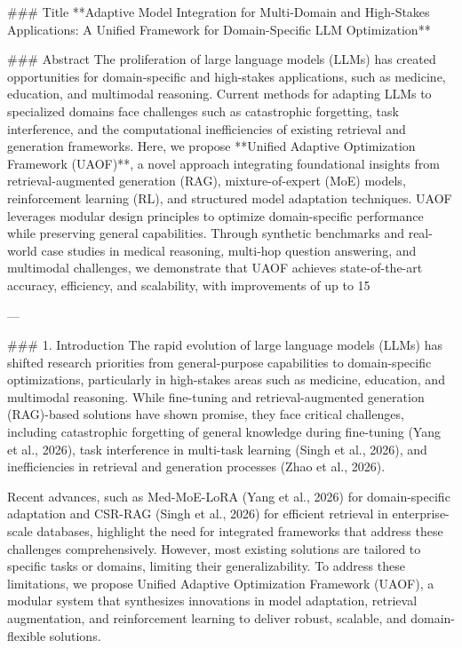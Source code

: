### Title
**Adaptive Model Integration for Multi-Domain and High-Stakes Applications: A Unified Framework for Domain-Specific LLM Optimization**

### Abstract
The proliferation of large language models (LLMs) has created opportunities for domain-specific and high-stakes applications, such as medicine, education, and multimodal reasoning. Current methods for adapting LLMs to specialized domains face challenges such as catastrophic forgetting, task interference, and the computational inefficiencies of existing retrieval and generation frameworks. Here, we propose **Unified Adaptive Optimization Framework (UAOF)**, a novel approach integrating foundational insights from retrieval-augmented generation (RAG), mixture-of-expert (MoE) models, reinforcement learning (RL), and structured model adaptation techniques. UAOF leverages modular design principles to optimize domain-specific performance while preserving general capabilities. Through synthetic benchmarks and real-world case studies in medical reasoning, multi-hop question answering, and multimodal challenges, we demonstrate that UAOF achieves state-of-the-art accuracy, efficiency, and scalability, with improvements of up to 15%

---

### 1. Introduction
The rapid evolution of large language models (LLMs) has shifted research priorities from general-purpose capabilities to domain-specific optimizations, particularly in high-stakes areas such as medicine, education, and multimodal reasoning. While fine-tuning and retrieval-augmented generation (RAG)-based solutions have shown promise, they face critical challenges, including catastrophic forgetting of general knowledge during fine-tuning (Yang et al., 2026), task interference in multi-task learning (Singh et al., 2026), and inefficiencies in retrieval and generation processes (Zhao et al., 2026).

Recent advances, such as Med-MoE-LoRA (Yang et al., 2026) for domain-specific adaptation and CSR-RAG (Singh et al., 2026) for efficient retrieval in enterprise-scale databases, highlight the need for integrated frameworks that address these challenges comprehensively. However, most existing solutions are tailored to specific tasks or domains, limiting their generalizability. To address these limitations, we propose Unified Adaptive Optimization Framework (UAOF), a modular system that synthesizes innovations in model adaptation, retrieval augmentation, and reinforcement learning to deliver robust, scalable, and domain-flexible solutions.

